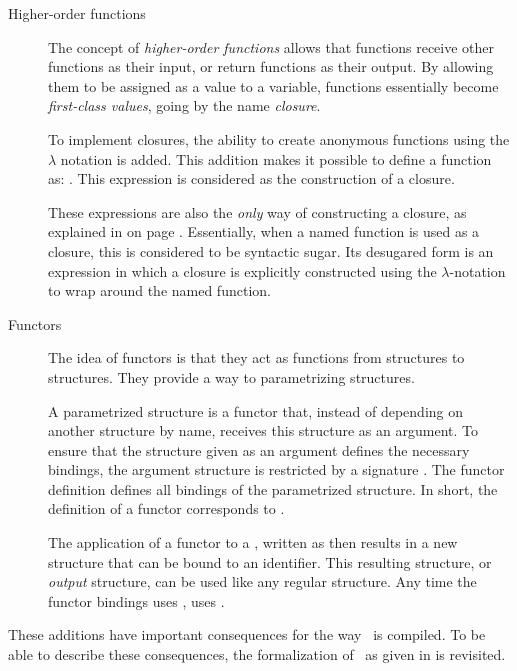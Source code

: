 \begin{description}
\item[Higher-order functions]
The concept of \emph{higher-order functions} allows that functions receive other functions as their input, or return functions as their output.
By allowing them to be assigned as a value to a variable, functions essentially become \emph{first-class values}, going by the name \emph{closure}.

To implement closures, the ability to create anonymous functions using the $\lambda$ notation is added.
This addition makes it possible to define a function as: .
This expression is considered as the construction of a closure.

These expressions are also the \emph{only} way of constructing a closure, as explained in  on page \pageref{sec:OnlyLambdaClosures}. 
Essentially, when a named function is used as a closure, this is considered to be syntactic sugar.
Its desugared form is an expression in which a closure is explicitly constructed using the $\lambda$-notation to wrap around the named function.

\item[Functors]
The idea of functors is that they act as functions from structures to structures.
They provide a way to parametrizing structures.

A parametrized structure is a functor  that, instead of depending on another structure  by name, receives this structure as an argument.
To ensure that the structure given as an argument defines the necessary bindings, the argument structure is restricted by a signature .
The functor definition defines all bindings of the parametrized structure.
In short, the definition of a functor corresponds to .

The application of a functor  to a , written as  then results in a new structure  that can be bound to an identifier.
This resulting structure, or \emph{output} structure, can be used like any regular structure. Any time the functor bindings uses ,  uses .
\end{description}

These additions have important consequences for the way \MiniML\ is compiled.
To be able to describe these consequences, the formalization of \MiniML\ as given in  is revisited.

